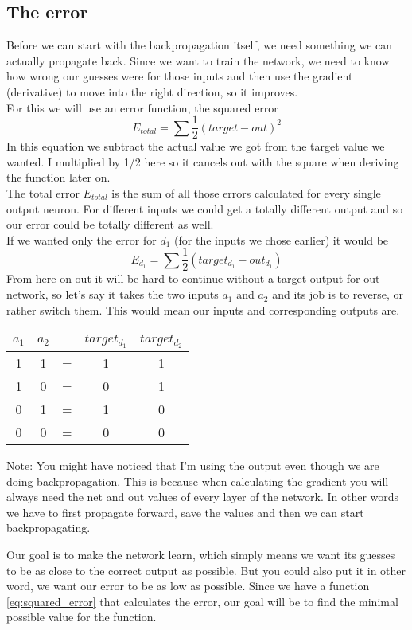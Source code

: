 \documentclass[11pt, halfparskip]{article}
\begin{document}
     \subsection{The error}
     \label{sec:the:error}
     Before we can start with the backpropagation itself, we need something we can actually propagate back. Since we want to train the network, we need to know how wrong our
     guesses were for those inputs and then use the gradient (derivative) to move into the right direction, so it improves.\\
     For this we will use an error function, the squared error 
     \begin{equation} 
     \label{eq:squared_error}
     	E_{total} = \sum \frac{1}{2}(target - out)^2
    \end{equation}
    In this equation we subtract the actual value we got from the target value we wanted. I multiplied by 1/2 here so it cancels out with the square when deriving the function later on.\\
    The total error $E_{total}$ is the sum of all those errors calculated for every single output neuron. For different inputs we could get a totally different output and so our error could 
    be totally different as well. \\
    If we wanted only the error for $d_1$ (for the inputs we chose earlier) it would be 
    \[
    	E_{d_1} = \sum \frac{1}{2}(target_{d_1} - out_{d_1})
    \]
    From here on out it will be hard to continue without a target output for out network, so let's say it takes the two inputs $a_1$ and $a_2$ and its job is to reverse, or rather switch
    them. This would mean our inputs and corresponding outputs are.
    \begin{center}
	    \begin{tabular}{c c c c c}
	    	$a_1$ & $a_2$ &  & $target_{d_1}$ & $target_{d_2}$\\
    		\hline
	    	1 & 1 & = & 1 & 1\\
    		1 & 0 & = & 0 & 1\\
	    	0 & 1 & = & 1 & 0\\
    		0 & 0 & = & 0 & 0
    	\end{tabular}
    \end{center}
    
    \noindent \newline
    \begin{tiny}
    Note: You might have noticed that I'm using the output even though we are doing backpropagation. This is because when calculating the gradient you will always need the net and out
    values of every layer of the network. In other words we have to first propagate forward, save the values and then we can start backpropagating.\\
    \end{tiny}
    Our goal is to make the network learn, which simply means we want its guesses to be as close to the correct output as possible. But you could also put it in other word, we want our
    error to be as low as possible. Since we have a function \ref{eq:squared_error} that calculates the error, our goal will be to find the minimal possible value for the function.\\
    
\end{document}
